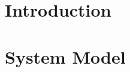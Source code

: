 \documentclass[a4paper,10pt,twoside]{report}
\author{\me}
\begin{document}


\normalsize

%
%
%
%
%
%
%
%
%
%
%
%
%
%
%
%
\chapter{Introduction}\label{ch:intro}
\setcounter{page}{0}


\clearemptydoublepage

\chapter{System Model}\label{ch:model}

\end{document}
